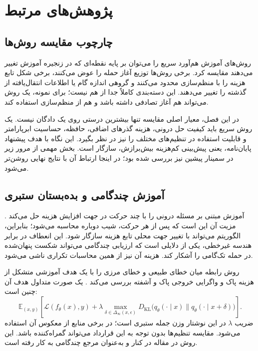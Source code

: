 \chapter{پژوهش‌های مرتبط}
\label{ch:literature}

\section{چارچوب مقایسه روش‌ها}
روش‌های آموزش هم‌آورد سریع را می‌توان بر پایه نقطه‌ای که در زنجیره آموزش تغییر می‌دهند مقایسه کرد. برخی روش‌ها توزیع آغاز حمله را عوض می‌کنند، برخی شکل تابع هزینه را با منظم‌سازی محدود می‌کنند و گروهی اندازه گام یا اطلاعات انتقال‌یافته از گذشته را تغییر می‌دهند. این دسته‌بندی کاملاً جدا از هم نیست؛ برای نمونه، یک روش می‌تواند هم آغاز تصادفی داشته باشد و هم از منظم‌سازی استفاده کند.

در این فصل، معیار اصلی مقایسه تنها بیشترین درستی روی یک دادگان نیست. یک روش سریع باید کیفیت حل درونی، هزینه گذرهای اضافی، حافظه، حساسیت ابرپارامتر و قابلیت استفاده در تنظیم‌های مختلف را نیز در نظر بگیرد. این نگاه با هدف پیشنهاد پایان‌نامه، یعنی پیش‌بینی کم‌هزینه بیش‌برازش، سازگار است. بخش مهمی از مرور زیر در سمینار پیشین نیز بررسی شده بود؛ در اینجا ارتباط آن با نتایج نهایی \sora{} روشن‌تر می‌شود.

\section{آموزش چندگامی و بده‌بستان ستبری}
آموزش مبتنی بر  مسئله درونی را با چند حرکت در جهت افزایش هزینه حل می‌کند \cite{madry2018towards}. مزیت آن این است که پس از هر حرکت، شیب دوباره محاسبه می‌شود؛ بنابراین، الگوریتم می‌تواند با تغییر جهت محلی تابع هزینه سازگار شود. این انعطاف در برابر هندسه غیرخطی، یکی از دلایلی است که ارزیابی چندگامی می‌تواند شکست پنهان‌شده در حمله تک‌گامی را آشکار کند. هزینه آن نیز از همین محاسبات تکراری ناشی می‌شود.

روش  رابطه میان خطای طبیعی و خطای مرزی را با یک هدف آموزشی متشکل از هزینه پاک و واگرایی خروجی پاک و آشفته بررسی می‌کند \cite{zhang2019theoretically}. یک صورت متداول هدف آن چنین است:
\begin{equation}
\mathbb E_{(x,y)}\left[\mathcal L(f_\theta(x),y)+\lambda
\max_{\delta\in\Delta_\infty(x,\epsilon)}
D_{\mathrm{KL}}\bigl(q_\theta(\cdot\mid x)\|q_\theta(\cdot\mid x+\delta)\bigr)\right].
\end{equation}
ضریب $\lambda$ در این نوشتار وزن جمله ستبری است؛ در برخی منابع از معکوس آن استفاده می‌شود. مقایسه تنظیم‌ها بدون توجه به این قرارداد می‌تواند گمراه‌کننده باشد. این روش در مقاله \sora{} در کنار  و  به‌عنوان مرجع چندگامی به کار رفته است.

